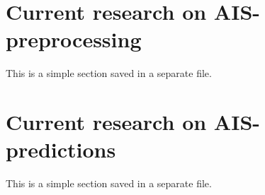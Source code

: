 \section{Current research on AIS-preprocessing}
\begin{info}{}
	This is a simple section saved in a separate file.
\end{info}





\section{Current research on AIS-predictions}
\begin{info}{}
	This is a simple section saved in a separate file.
\end{info}







